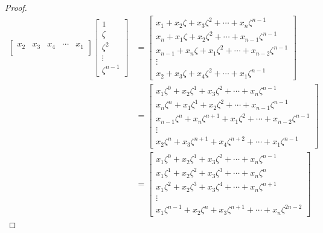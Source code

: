 \documentclass[../psets.tex]{subfiles}
\begin{document}
\begin{enumerate}
\begin{enumerate}
\begin{proof}
\begin{align*}
\begin{bmatrix}
                    x_2     & x_3    & x_4    & \cdots & x_1    \\
                \end{bmatrix}
                \begin{bmatrix}
                    1\\
                    \zeta\\
                    \zeta^2\\
                    \vdots\\
                    \zeta^{n-1}
                \end{bmatrix}
                &=
                \begin{bmatrix}
                    x_1+x_2\zeta+x_3\zeta^2+\cdots+x_n\zeta^{n-1}\\
                    x_n+x_1\zeta+x_2\zeta^2+\cdots+x_{n-1}\zeta^{n-1}\\
                    x_{n-1}+x_n\zeta+x_1\zeta^2+\cdots+x_{n-2}\zeta^{n-1}\\
                    \vdots\\
                    x_2+x_3\zeta+x_4\zeta^2+\cdots+x_1\zeta^{n-1}
                \end{bmatrix}\\
                &=
                \begin{bmatrix}
                    x_1\zeta^0+x_2\zeta^1+x_3\zeta^2+\cdots+x_n\zeta^{n-1}\\
                    x_n\zeta^n+x_1\zeta^1+x_2\zeta^2+\cdots+x_{n-1}\zeta^{n-1}\\
                    x_{n-1}\zeta^n+x_n\zeta^{n+1}+x_1\zeta^2+\cdots+x_{n-2}\zeta^{n-1}\\
                    \vdots\\
                    x_2\zeta^n+x_3\zeta^{n+1}+x_4\zeta^{n+2}+\cdots+x_1\zeta^{n-1}
                \end{bmatrix}\\
                &=
                \begin{bmatrix}
                    x_1\zeta^0+x_2\zeta^1+x_3\zeta^2+\cdots+x_n\zeta^{n-1}\\
                    x_1\zeta^1+x_2\zeta^2+x_3\zeta^3+\cdots+x_n\zeta^n\\
                    x_1\zeta^2+x_2\zeta^3+x_3\zeta^4+\cdots+x_n\zeta^{n+1}\\
                    \vdots\\
                    x_1\zeta^{n-1}+x_2\zeta^n+x_3\zeta^{n+1}+\cdots+x_n\zeta^{2n-2}

\end{bmatrix}
\end{align*}
\end{proof}
\end{enumerate}
\end{enumerate}
\end{document}
